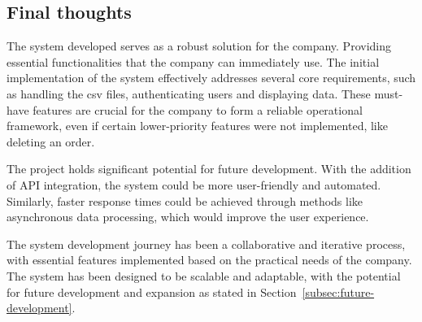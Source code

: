 \subsection{Final thoughts}\label{subsec:final-thoughts}

The system developed serves as a robust solution for the company.
Providing essential functionalities that the company can immediately use.
The initial implementation of the system effectively addresses several core requirements, such as handling the
csv files, authenticating users and displaying data.
These must-have features are crucial for the company to form a reliable operational framework, even if certain
lower-priority features were not implemented, like deleting an order.

The project holds significant potential for future development.
With the addition of API integration, the system could be more user-friendly and automated.
Similarly, faster response times could be achieved through methods like asynchronous data processing, which would
improve the user experience.

The system development journey has been a collaborative and iterative process, with essential features implemented
based on the practical needs of the company.
The system has been designed to be scalable and adaptable, with the potential for future development and expansion as
stated in Section~\ref{subsec:future-development}.

